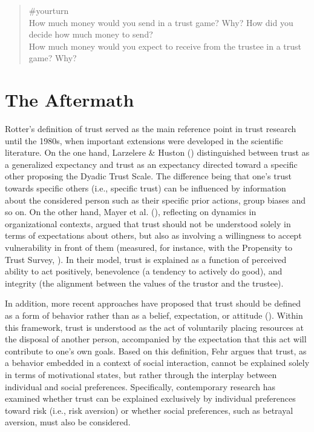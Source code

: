 \documentclass[
  letterpaper,
]{book}
\begin{document}
\begin{quote}
{\#yourturn}\\
How much money would you send in a trust game? Why? How did you decide
how much money to send?\\
How much money would you expect to receive from the trustee in a trust
game? Why?
\end{quote}

\section{The Aftermath}\label{the-aftermath-11}

Rotter's definition of trust served as the main reference point in trust
research until the 1980s, when important extensions were developed in
the scientific literature. On the one hand, Larzelere \& Huston
() distinguished between trust
as a generalized expectancy and trust as an expectancy directed toward a
specific other proposing the Dyadic Trust Scale. The difference being
that one's trust towards specific others (i.e., specific trust) can be
influenced by information about the considered person such as their
specific prior actions, group biases and so on. On the other hand, Mayer
et al. (), reflecting on
dynamics in organizational contexts, argued that trust should not be
understood solely in terms of expectations about others, but also as
involving a willingness to accept vulnerability in front of them
(measured, for instance, with the Propensity to Trust Survey,
). In their
model, trust is explained as a function of perceived ability to act
positively, benevolence (a tendency to actively do good), and integrity
(the alignment between the values of the trustor and the trustee).

In addition, more recent approaches have proposed that trust should be
defined as a form of behavior rather than as a belief, expectation, or
attitude (). Within this
framework, trust is understood as the act of voluntarily placing
resources at the disposal of another person, accompanied by the
expectation that this act will contribute to one's own goals. Based on
this definition, Fehr argues that trust, as a behavior embedded in a
context of social interaction, cannot be explained solely in terms of
motivational states, but rather through the interplay between individual
and social preferences. Specifically, contemporary research has examined
whether trust can be explained exclusively by individual preferences
toward risk (i.e., risk aversion) or whether social preferences, such as
betrayal aversion, must also be considered.
\end{document}
